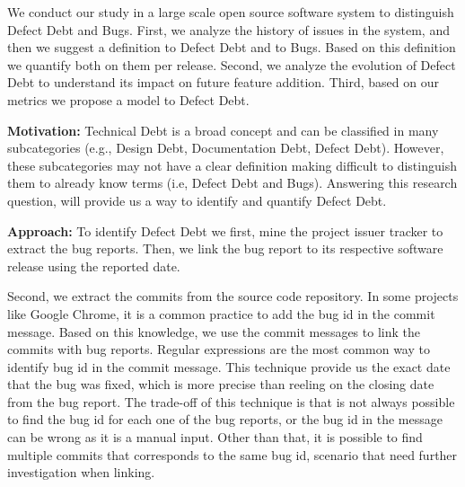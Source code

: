 We conduct our study in a large scale open source software system to distinguish Defect Debt and Bugs. First, we analyze the history of issues in the system, and then we suggest a definition to Defect Debt and to Bugs. Based on this definition we quantify  both on them per release. Second, we analyze the evolution of Defect Debt to understand its impact on future feature addition. Third, based on our metrics we propose a model to Defect Debt.

\vspace{3mm}
\noindent\rqi
\vspace{3mm}

\noindent\textbf{Motivation:} Technical Debt is a broad concept and can be classified in many subcategories (e.g., Design Debt, Documentation Debt, Defect Debt). However, these subcategories may not have a clear definition making difficult to distinguish them to already know terms (i.e, Defect Debt and Bugs). Answering this research question, will provide us a way to identify and quantify Defect Debt. 

\vspace{1mm}
\noindent\textbf{Approach:} To identify Defect Debt we first, mine the project issuer tracker to extract the bug reports. Then, we link the bug report to its respective software release using the reported date. 

Second, we extract the commits from the source code repository. In some projects like Google Chrome, it is a common practice to add the bug id in the commit message. Based on this knowledge, we use the commit messages to link the commits with bug reports. Regular expressions are the most common way to identify bug id in the commit message. This technique provide us the exact date that the bug was fixed, which is more precise than reeling on the closing date from the bug report. The trade-off of this technique is that is not always possible to find the bug id for each one of the bug reports, or the bug id in the message can be wrong as it is a manual input.  Other than that, it is possible to find multiple commits that corresponds to the same bug id, scenario that need further investigation when linking. 


